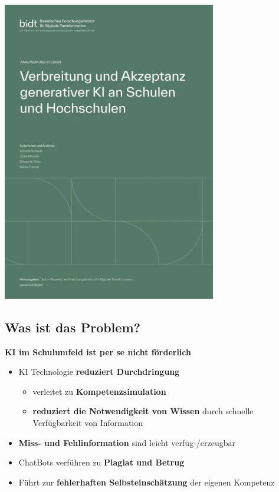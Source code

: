 \documentclass[
  letterpaper,
  DIV=11,
  numbers=noendperiod]{scrartcl}
\providecommand{\tightlist}{%
  \setlength{\itemsep}{0pt}\setlength{\parskip}{0pt}}\usepackage{longtable,booktabs,array}
\begin{document}
\includegraphics[width=0.7\textwidth,height=\textheight]{images/bidt_Studie_Generative_KI-an_Schulen_und_Hochschulen.webp}

\subsection{Was ist das Problem?}\label{was-ist-das-problem}

\textbf{KI im Schulumfeld ist per se nicht förderlich}

\begin{itemize}
\tightlist
\item
  KI Technologie {\textbf{reduziert Durchdringung}}

  \begin{itemize}
  \tightlist
  \item
    verleitet zu {\textbf{Kompetenzsimulation}}
  \item
    {\textbf{reduziert die Notwendigkeit von Wissen}} durch schnelle
    Verfügbarkeit von Information
  \end{itemize}
\item
  {\textbf{Miss- und Fehlinformation}} sind leicht verfüg-/erzeugbar
\item
  ChatBots verführen zu {\textbf{Plagiat und Betrug}}
\item
  Führt zur {\textbf{fehlerhaften Selbsteinschätzung}} der eigenen
  Kompetenz
\end{itemize}
\end{document}
